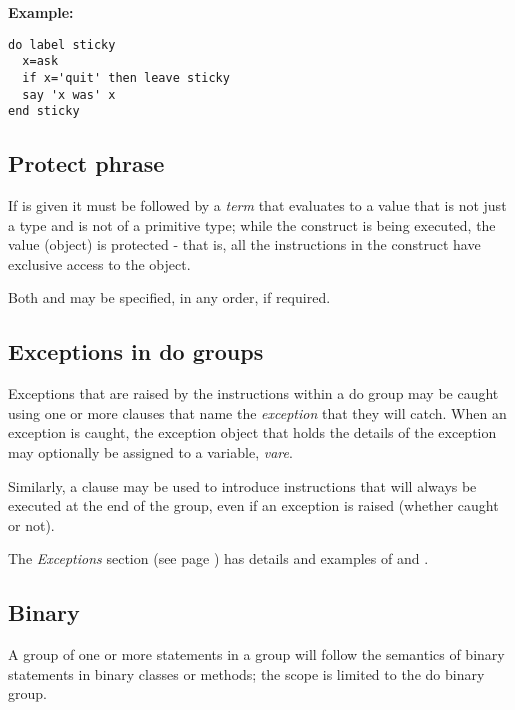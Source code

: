 \textbf{Example:}
\begin{lstlisting}
do label sticky
  x=ask
  if x='quit' then leave sticky
  say 'x was' x
end sticky
\end{lstlisting}
\subsection{Protect phrase}
 
If  is given it must be followed by a \emph{term}
that evaluates to a value that is not just a type and is not of a
primitive type; while the  construct is being executed, the
value (object) is protected - that is, all the instructions in the
 construct have exclusive access to the object.
 
Both  and  may be specified, in any order,
if required.
\subsection{Exceptions in do groups}
 
Exceptions that are raised by the instructions within a do group may be
caught using one or more  clauses that name the
\emph{exception} that they will catch.
When an exception is caught, the exception object that holds the details
of the exception may optionally be assigned to a variable,
\emph{vare}.
 
Similarly, a  clause may be used to introduce
instructions that will always be executed at the end of the group, even
if an exception is raised (whether caught or not).
 
The  \emph{Exceptions} section (see page \pageref{refexcep})  has details and
examples of  and .

\subsection{Binary}
A group of one or more statements in a  group will
follow the semantics of binary statements in binary classes or
methods; the scope is limited to the do binary group.